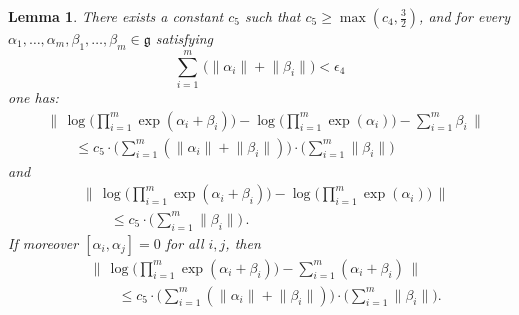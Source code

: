 \documentclass[10pt, a4paper]{amsart}
\newtheorem{lem}[equation]{Lemma}
\theoremstyle{definition}
\numberwithin{equation}{section}
\newcommand{\opn}{\operatorname}
\newcommand{\mfrak}[1]{\mathfrak{#1}}
\newcommand{\smfrac}[2]{{\textstyle \frac{#1}{#2}}}
\newcommand{\norm}[1]{\lVert #1 \rVert}
\newcommand{\Norm}[1]{\bigl\lVert\, #1 \, \bigr\rVert}
\newcommand{\g}{\mfrak{g}}
\begin{document}
\begin{lem} \label{lem:36}
There exists a constant $c_5$ such that 
$c_5 \geq \max( c_4, \smfrac{3}{2} )$, 
and for every   
$\alpha_1, \ldots, \alpha_m, \beta_1, \ldots, \beta_m \in \g$ 
satisfying
\[ \sum_{i = 1}^m\, \bigl( \norm{\alpha_i} + \norm{\beta_i} \bigr)
< \epsilon_4 \]
one has:
\begin{equation} \label{eqn:94}
\begin{aligned}
& \Norm{ \opn{log} 
\bigl( \prod\nolimits_{i=1}^m \opn{exp}(\alpha_i + \beta_i) \bigr) -
\opn{log} \bigl(   \prod\nolimits_{i=1}^m \opn{exp}(\alpha_i) \bigr) -
\sum\nolimits_{i=1}^m \beta_i } \\
& \qquad %
\leq c_5 \cdot \bigl( \sum\nolimits_{i=1}^m (\norm{\alpha_i}  +
\norm{\beta_i}) \bigr) \cdot 
\bigl( \sum\nolimits_{i=1}^m \norm{\beta_i} \bigr) 
\end{aligned} 
\end{equation}
and
\begin{equation} \label{eqn:95}
\begin{aligned}
& \Norm{ \opn{log} 
\bigl( \prod\nolimits_{i=1}^m \opn{exp}(\alpha_i + \beta_i) \bigr) -
\opn{log} 
\bigl( \prod\nolimits_{i=1}^m \opn{exp}(\alpha_i) \bigr) } \\
& \qquad 
\leq c_5 \cdot 
\bigl( \sum\nolimits_{i=1}^m \norm{\beta_i} \bigr) \, .
\end{aligned} 
\end{equation}
If moreover $[\alpha_i, \alpha_j] = 0$ for all $i, j$, then
\begin{equation} \label{eqn:96}
\begin{aligned}
& \Norm{ \opn{log} 
\bigl( \prod\nolimits_{i=1}^m \opn{exp}(\alpha_i + \beta_i) \bigr) -
\sum\nolimits_{i=1}^m (\alpha_i + \beta_i) } \\
& \qquad %
\leq c_5 \cdot \bigl( \sum\nolimits_{i=1}^m (\norm{\alpha_i}  +
\norm{\beta_i}) \bigr) \cdot 
\bigl( \sum\nolimits_{i=1}^m \norm{\beta_i} \bigr) .
\end{aligned} 
\end{equation}
\end{lem}
\end{document}
